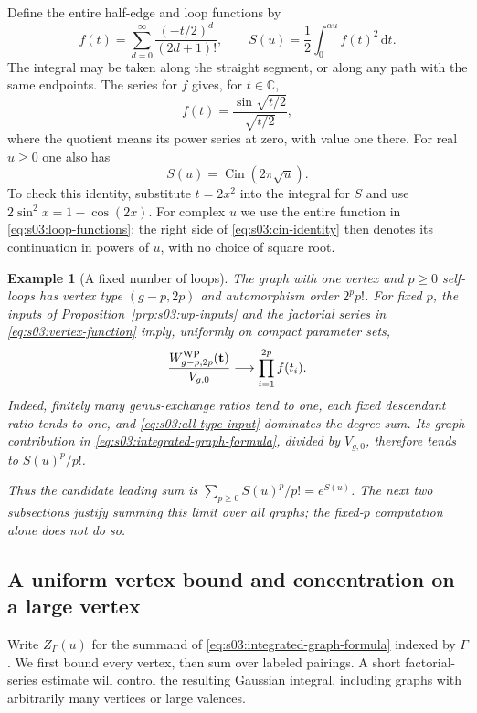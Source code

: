 \documentclass[a4paper,10pt]{article}
\numberwithin{equation}{section}
\newcommand{\dd}{\mathrm{d}}
\DeclareMathOperator{\Cin}{\mathrm{Cin}}
\theoremstyle{paperplain}
\theoremstyle{paperremark}
\newtheorem{exm}{Example}[section]
\theoremstyle{paperplain}
\begin{document}
Define the entire half-edge and loop functions by
\begin{equation}
\label{eq:s03:loop-functions}
f(t)=\sum_{d=0}^{\infty}\frac{(-t/2)^d}{(2d+1)!},
\qquad
S(u)=\frac12\int_0^{\alpha u}f(t)^2\,\dd t.
\end{equation}
The integral may be taken along the straight segment, or along any path
with the same endpoints. The series for $f$ gives, for $t\in\mathbb C$,
\begin{equation}
\label{eq:s03:sine-function}
f(t)=\frac{\sin\sqrt{t/2}}{\sqrt{t/2}},
\end{equation}
where the quotient means its power series at zero, with value one there.
For real $u\geq0$ one also has
\begin{equation}
\label{eq:s03:cin-identity}
S(u)=\Cin(2\pi\sqrt u).
\end{equation}
To check this identity, substitute $t=2x^2$ into the
integral for $S$ and use $2\sin^2x=1-\cos(2x)$. For complex $u$ we use
the entire function in \eqref{eq:s03:loop-functions}; the right side of
\eqref{eq:s03:cin-identity} then denotes its continuation in powers of
$u$, with no choice of square root.

\begin{exm}[A fixed number of loops]
The graph with one vertex and $p\geq0$ self-loops has vertex type
$(g-p,2p)$ and automorphism order $2^p p!$. For fixed $p$, the inputs
of Proposition~\ref{prp:s03:wp-inputs} and the factorial series in
\eqref{eq:s03:vertex-function} imply, uniformly on compact parameter
sets,
\[
\frac{W^{\rm WP}_{g-p,2p}(\mathbf t)}{V_{g,0}}
\longrightarrow\prod_{i=1}^{2p}f(t_i).
\]
Indeed, finitely many genus-exchange ratios tend to one, each fixed
descendant ratio tends to one, and
\eqref{eq:s03:all-type-input} dominates the degree sum.
Its graph contribution in \eqref{eq:s03:integrated-graph-formula},
divided by $V_{g,0}$, therefore tends to $S(u)^p/p!$.

Thus the candidate leading sum is $\sum_{p\geq0}S(u)^p/p!=e^{S(u)}$.
The next two subsections justify summing this limit over all graphs;
the fixed-$p$ computation alone does not do so.
\end{exm}

\subsection{A uniform vertex bound and concentration on a large vertex}
\label{subsec:s03:03}

Write $Z_\Gamma(u)$ for the summand of
\eqref{eq:s03:integrated-graph-formula} indexed by $\Gamma$.
We first bound every vertex, then sum over labeled pairings. A short
factorial-series estimate will control the resulting Gaussian integral,
including graphs with arbitrarily many vertices or large valences.
\end{document}
